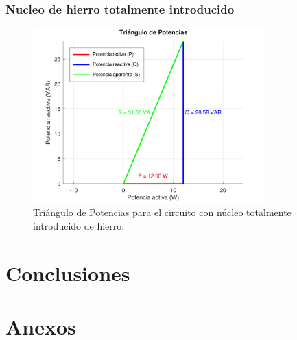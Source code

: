 \documentclass{article}
\begin{document}
        \subsubsection{Nucleo de hierro totalmente introducido}
            \begin{figure}[H]
                \centering
                \includegraphics[width=0.8\textwidth]{graficoTotalHierro.png}
                \caption{Triángulo de Potencias para el circuito con núcleo totalmente introducido de hierro.}
                \label{fig:graficoTotalHierro}
            \end{figure}

    \section{Conclusiones}

    \section{Anexos}
\end{document}
